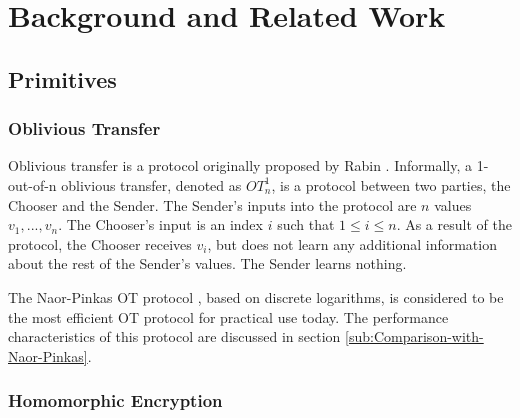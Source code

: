 
\section{Background and Related Work}


\subsection{Primitives \label{sub:Primitives}}


\subsubsection{Oblivious Transfer}

Oblivious transfer is a protocol originally proposed by Rabin \cite{Rabin81}.
Informally, a 1-out-of-n oblivious transfer, denoted as $OT_{n}^{1}$,
is a protocol between two parties, the Chooser and the Sender. The
Sender's inputs into the protocol are $n$ values $v_{1},...,v_{n}$.
The Chooser's input is an index $i$ such that $1\le i\le n$. As
a result of the protocol, the Chooser receives $v_{i}$, but does
not learn any additional information about the rest of the Sender's
values. The Sender learns nothing. 

The Naor-Pinkas OT protocol \cite{NaorPinkas99}, based on discrete
logarithms, is considered to be the most efficient OT protocol for
practical use today. The performance characteristics of this protocol
are discussed in section \ref{sub:Comparison-with-Naor-Pinkas}.


\subsubsection{Homomorphic Encryption}

